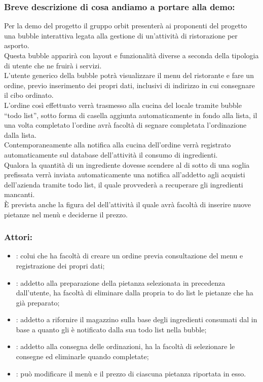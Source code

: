 \subsubsection{Breve descrizione di cosa andiamo a portare alla demo:}
Per la demo del progetto il gruppo orbit presenterà ai proponenti del progetto una bubble interattiva legata alla gestione di un'attività di ristorazione per asporto.
\\Questa bubble apparirà con layout e funzionalità diverse a seconda della tipologia di utente che ne fruirà i servizi.
\\L’utente generico della bubble potrà visualizzare il menu del ristorante e fare un ordine, previo inserimento dei propri dati, inclusivi di indirizzo in cui consegnare il cibo ordinato.
\\L'ordine così effettuato verrà trasmesso alla cucina del locale tramite bubble “todo list”, sotto forma di casella aggiunta automaticamente in fondo alla lista, il  una volta completato l'ordine avrà facoltà di segnare completata l’ordinazione dalla lista.
\\Contemporaneamente alla notifica alla cucina dell’ordine verrà registrato automaticamente sul database dell’attività il consumo di ingredienti.
\\Qualora la quantità di un ingrediente dovesse scendere al di sotto di una soglia prefissata verrà inviata automaticamente una notifica all’addetto agli acquisti dell’azienda tramite todo list, il quale provvederà a recuperare gli ingredienti mancanti.
\\È prevista anche la figura del  dell'attività il quale avrà facoltà di inserire nuove pietanze nel menù e deciderne il prezzo.

\subsubsection{Attori:}
\begin{itemize}
	\item {}: colui che ha facoltà di creare un ordine previa consultazione del menu e registrazione dei propri dati;
	\item {}: addetto alla preparazione della pietanza selezionata in precedenza dall’utente, ha facoltà di eliminare dalla propria to do list le pietanze che ha già preparato;
	\item {}: addetto a rifornire il magazzino sulla base degli ingredienti consumati dal  in base a quanto gli è notificato dalla sua todo list nella bubble;
	\item {}: addetto alla consegna delle ordinazioni, ha la facoltà di selezionare le consegne ed eliminarle quando completate;
	\item {}: può modificare il menù e il prezzo di ciascuna pietanza riportata in esso.
\end{itemize}

